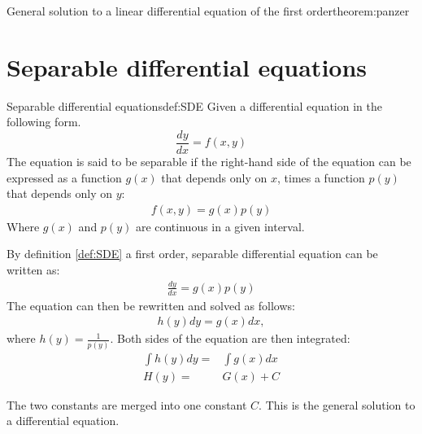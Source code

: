 \begin{theorem}{General solution to a linear differential equation of the first order}{theorem:panzer}
\section{Separable differential equations}\label{SepDiff}
\begin{definition}{Separable differential equations}{def:SDE}
Given a differential equation in the following form. 
$$\frac{dy}{dx} = f(x,y)$$
The equation is said to be separable if the right-hand side of the equation can be expressed as a function $g(x)$ that depends only on $x$, times a function $p(y)$ that depends only on $y$:
\begin{align}
f(x,y)=g(x)p(y)
\end{align}
Where $g(x)$ and $p(y)$ are continuous in a given interval.
\end{definition}
\noindent
By definition \ref{def:SDE} a first order, separable differential equation can be written as:
\begin{align}
	\frac{dy}{dx}=g(x)p(y)
\end{align}
The equation can then be rewritten and solved as follows:
\begin{align}
	h(y)dy=g(x)dx,
\end{align}
where $h(y) = \frac{1}{p(y)}$. Both sides of the equation are then integrated:
 \begin{align}
 	\int h(y)dy =&\int g(x)dx   \\
 	H(y)=&G(x)+C \label{SDEG}
 \end{align}
 
The two constants are merged into one constant $C$. This is the general solution to a differential equation. \cite{diffandcomplex}


\end{theorem}

